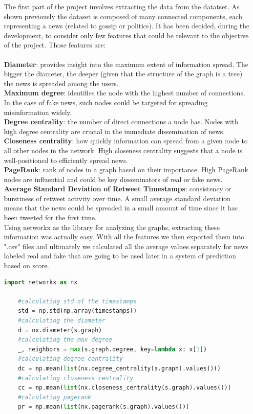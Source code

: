 \documentclass[11pt,a4paper]{article}
\begin{document}
The first part of the project involves extracting the data from the datatset. As shown previously the dataset is composed of many connected components, each representing a news (related to gossip or politics). It has been decided, during the development, to consider only few features that could be relevant to the objective of the project.
Those features are:\\\\
\textbf{Diameter}: provides insight into the maximum extent of information spread. The bigger the diameter, the deeper (given that the structure of the graph is a tree) the news is spreaded among the users.\\
\textbf{Maximum degree}: identifies the node with the highest number of connections. In the case of fake news, such nodes could be targeted for spreading misinformation widely.\\
\textbf{Degree centrality}: the number of direct connections a node has. Nodes with high degree centrality are crucial in the immediate dissemination of news.\\
\textbf{Closeness centrality}: how quickly information can spread from a given node to all other nodes in the network. High closeness centrality suggests that a node is well-positioned to efficiently spread news.\\
\textbf{PageRank}: rank of nodes in a graph based on their importance. High PageRank nodes are influential and could be key disseminators of real or fake news.\\
\textbf{Average Standard Deviation of Retweet Timestamps}: consistency or burstiness of retweet activity over time. A small average standard deviation means that the news could be spreaded in a small amount of time since it has been tweeted for the first time.\\

Using networkx\cite{networkx} as the library for analyzing the graphs, extracting these information was actually easy. With all the features we then exported them into ".csv" files and ultimately we calculated all the average values separately for news labeled real and fake that are going to be used later in a system of prediction based on score.

\begin{lstlisting}[language=Python]
    import networkx as nx

    #calculating std of the timestamps
    std = np.std(np.array(timestamps))
    #calculating the diameter
    d = nx.diameter(s.graph)
    #calculating the max degree
    _, neighbors = max(s.graph.degree, key=lambda x: x[1])
    #calculating degree centrality
    dc = np.mean(list(nx.degree_centrality(s.graph).values()))
    #calculating closeness centrality
    cc = np.mean(list(nx.closeness_centrality(s.graph).values()))
    #calculating pagerank
    pr = np.mean(list(nx.pagerank(s.graph).values()))
\end{lstlisting}
\end{document}

